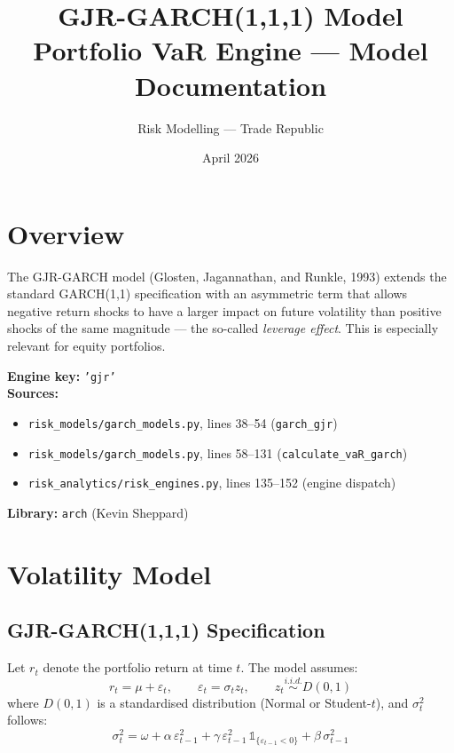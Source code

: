 \documentclass[11pt, a4paper]{article}
\title{\textbf{GJR-GARCH(1,1,1) Model}\\[4pt]
\large Portfolio VaR Engine --- Model Documentation}
\author{Risk Modelling --- Trade Republic}
\date{April 2026}
\begin{document}
\maketitle

\section{Overview}

The GJR-GARCH model (Glosten, Jagannathan, and Runkle, 1993) extends the
standard GARCH(1,1) specification with an asymmetric term that allows
negative return shocks to have a larger impact on future volatility than
positive shocks of the same magnitude --- the so-called \textit{leverage
effect}. This is especially relevant for equity portfolios.

\textbf{Engine key:} \texttt{'gjr'} \\
\textbf{Sources:}
\begin{itemize}
  \item \texttt{risk\_models/garch\_models.py}, lines 38--54 (\texttt{garch\_gjr})
  \item \texttt{risk\_models/garch\_models.py}, lines 58--131 (\texttt{calculate\_vaR\_garch})
  \item \texttt{risk\_analytics/risk\_engines.py}, lines 135--152 (engine dispatch)
\end{itemize}
\textbf{Library:} \texttt{arch} (Kevin Sheppard)

\section{Volatility Model}

\subsection{GJR-GARCH(1,1,1) Specification}

Let $r_t$ denote the portfolio return at time $t$. The model assumes:
\begin{equation}
r_t = \mu + \varepsilon_t, \qquad \varepsilon_t = \sigma_t z_t,
\qquad z_t \overset{i.i.d.}{\sim} D(0,1)
\end{equation}
where $D(0,1)$ is a standardised distribution (Normal or Student-$t$),
and $\sigma_t^2$ follows:
\begin{equation}
\sigma_t^2 = \omega
  + \alpha \, \varepsilon_{t-1}^2
  + \gamma \, \varepsilon_{t-1}^2 \, \mathbb{1}_{\{\varepsilon_{t-1} < 0\}}
  + \beta \, \sigma_{t-1}^2
\label{eq:gjr}
\end{equation}
\end{document}
